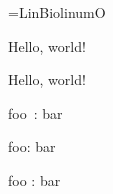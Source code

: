 

\font\bio=LinBiolinumO\bio

Hello, world!

\InterCharNodeOn
Hello, world!

\InterCharNodeOff

\hsize=1pt
foo\ : bar

\InterCharNodeOn
foo: bar

foo : bar

\InterCharNodeOff
\bye
